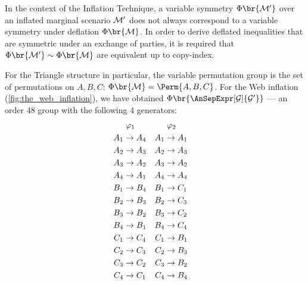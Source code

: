 \documentclass[aps, 10pt, english, twoside, pra, nofootinbib, tightenlines, longbibliography, superscriptaddress]{revtex4-1}
\begin{document}
    In the context of the Inflation Technique, a variable symmetry $\Phi\br{\mscenario'}$ over an inflated marginal scenario $\mathcal{M}'$ does not always correspond to a variable symmetry under deflation $\Phi\br{\mscenario}$. In order to derive deflated inequalities that are symmetric under an exchange of parties, it is required that $\Phi\br{\mscenario'} \sim \Phi\br{\mscenario}$ are equivalent up to copy-index.

    For the Triangle structure in particular, the variable permutation group is the set of permutations on $A, B, C$: $\Phi\br{\mscenario} = \Perm{A, B, C}$. For the Web inflation (\cref{fig:the_web_inflation}), we have obtained $\gp\br{\AnSepExpr[\graph]{\graph'}}$ --- an order $48$ group with the following $4$ generators:
    \begin{equation*}
    \begin{aligned}[c]
    &\hspace{1mm}\varphi_1 \\
    A_1 &\to A_4 \\A_2 &\to A_3 \\A_3 &\to A_2 \\A_4 &\to A_1 \\B_1 &\to B_4 \\B_2 &\to B_3 \\B_3 &\to B_2 \\B_4 &\to B_1 \\C_1 &\to C_4 \\C_2 &\to C_3 \\C_3 &\to C_2 \\C_4 &\to C_1
    \end{aligned}
    \quad
    \begin{aligned}[c]
    &\hspace{1mm}\varphi_2 \\
    A_1 &\to A_1 \\A_2 &\to A_3 \\A_3 &\to A_2 \\A_4 &\to A_4 \\B_1 &\to C_1 \\B_2 &\to C_3 \\B_3 &\to C_2 \\B_4 &\to C_4 \\C_1 &\to B_1 \\C_2 &\to B_3 \\C_3 &\to B_2 \\C_4 &\to B_4
    \end{aligned}
    \quad
    \begin{aligned}[c]

\end{aligned}
\end{equation*}
\end{document}
